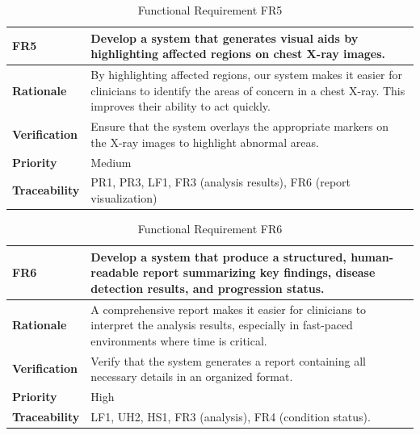 \documentclass[12pt]{article}
\begin{document}
\begin{table}[h!]
\centering
{}
\begin{tabular}{|p{3.5cm}|p{11.5cm}|}
\hline
\rowcolor{gray!30}
\textbf{FR5} & Develop a system that generates visual aids by highlighting affected regions on chest X-ray images. \\
\hline
\textbf{Rationale} & By highlighting affected regions, our system makes it easier for clinicians to identify the areas of concern in a chest X-ray. This improves their ability to act quickly. \\
\hline
\textbf{Verification} & Ensure that the system overlays the appropriate markers on the X-ray images to highlight abnormal areas. \\
\hline
\textbf{Priority} & Medium\\
\hline
\textbf{Traceability} & PR1, PR3, LF1, FR3 (analysis results), FR6 (report visualization) \\
\hline
\end{tabular}
\caption{Functional Requirement FR5}
\end{table}
\begin{table}[h!]
\centering
{}
\begin{tabular}{|p{3.5cm}|p{11.5cm}|}
\hline
\rowcolor{gray!30}
\textbf{FR6} & Develop a system that produce a structured, human-readable report summarizing key findings, disease detection results, and progression status. \\
\hline
\textbf{Rationale} & A comprehensive report makes it easier for clinicians to interpret the analysis results, especially in fast-paced environments where time is critical. \\
\hline
\textbf{Verification} & Verify that the system generates a report containing all necessary details in an organized format. \\
\hline
\textbf{Priority} & High \\
\hline
\textbf{Traceability} &  LF1, UH2, HS1, FR3 (analysis), FR4 (condition status). \\
\hline
\end{tabular}
\caption{Functional Requirement FR6}
\end{table}
\end{document}
